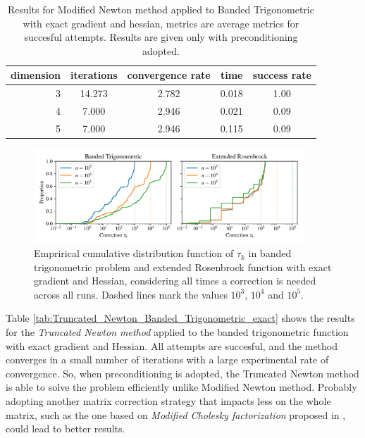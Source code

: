 \begin{table}
\centering
\caption{Results for Modified Newton method applied to Banded Trigonometric with exact gradient and hessian, metrics are average metrics for succesful attempts. Results are given only with preconditioning adopted.}
\label{tab:Modified_Newton_Banded_Trigonometric_exact}
\begin{tabular}{r|cc|cc}
\toprule
    dimension & iterations & convergence rate & time & success rate \\
\midrule
3 & 14.273 & 2.782 & 0.018 & 1.00 \\
4 & 7.000 & 2.946 & 0.021 & 0.09 \\
5 & 7.000 & 2.946 & 0.115 & 0.09 \\
\bottomrule
\end{tabular}
\end{table}

\begin{figure}
    \centering
    \includegraphics[width=0.9\textwidth]{figures/correction_comparison.pdf}
    \caption{Emprirical cumulative distribution function of $\tau_k$ in banded trigonometric problem and extended Rosenbrock function with exact gradient and Hessian, considering all times a correction is needed across all runs. Dashed lines mark the values $10^3$, $10^4$ and $10^5$.}
    \label{fig:correction_comparison}

\end{figure}

Table \ref{tab:Truncated_Newton_Banded_Trigonometric_exact} shows the results for the \textit{Truncated Newton method} applied to the banded trigonometric function with exact gradient and Hessian.
All attempts are succesful, and the method converges in a small number of iterations with a large experimental rate of convergence.
So, when preconditioning is adopted, the Truncated Newton method is able to solve the problem efficiently unlike Modified Newton method.
Probably adopting another matrix correction strategy that impacts less on the whole matrix, such as the one based on \textit{Modified Cholesky factorization} proposed in \cite{nocedal-optimization}, could lead to better results.

